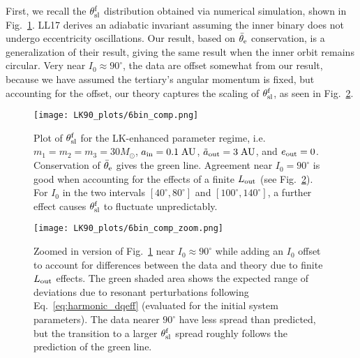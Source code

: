 \documentclass[
        twocolumn,
        twocolappendix
    ]{aastex63}
\begin{document}
First, we recall the $\theta_{\rm sl}^{\rm f}$ distribution obtained via
numerical simulation, shown in Fig.~\ref{fig:bin_comp}. LL17 derives an
adiabatic invariant assuming the inner binary does not undergo eccentricity
oscillations. Our result, based on $\bar{\theta}_{\rm e}$ conservation, is a
generalization of their result, giving the same result when the inner orbit
remains circular. Very near $I_0 \approx 90^\circ$, the data are offset somewhat
from our result, because we have assumed the tertiary's angular momentum is
fixed, but accounting for the offset, our theory captures the scaling of
$\theta_{\rm sl}^{\rm f}$, as seen in Fig.~\ref{fig:bin_comp_zoom}.

\begin{figure}
    \centering
    \texttt{[image: LK90\_plots/6bin\_comp.png]}
    \caption{Plot of $\theta_{\rm sl}^{\rm f}$ for the LK-enhanced parameter
    regime, i.e.\ $m_1 = m_2 = m_3 = 30M_{\odot}$,
    $a_{\rm in} = 0.1\;\mathrm{AU}$, $\tilde{a}_{\rm out} = 3\;\mathrm{AU}$, and $e_{\rm out}
    = 0$. Conservation of $\bar{\theta}_{\rm e}$ gives the green line. Agreement near
    $I_0 = 90^\circ$ is good when accounting for the effects of a finite
    $L_{\rm out}$ (see Fig.~\ref{fig:bin_comp_zoom}). For $I_0$ in the two
    intervals $[40^\circ, 80^\circ]$ and $[100^\circ, 140^\circ]$, a further
    effect causes $\theta_{\rm sl}^{\rm f}$ to fluctuate
    unpredictably.}\label{fig:bin_comp}
\end{figure}

\begin{figure}
    \centering
    \texttt{[image: LK90\_plots/6bin\_comp\_zoom.png]}
    \caption{Zoomed in version of Fig.~\ref{fig:bin_comp} near $I_0 \approx
    90^\circ$ while adding an $I_0$ offset to account for differences between
    the data and theory due to finite $L_{\rm out}$ effects. The green shaded
    area shows the expected range of deviations due to resonant perturbations
    following Eq.~\eqref{eq:harmonic_dqeff} (evaluated for the initial system
    parameters). The data nearer $90^\circ$ have less spread than predicted, but
    the transition to a larger $\theta_{\rm sl}^{\rm f}$ spread roughly follows
    the prediction of the green line.}\label{fig:bin_comp_zoom}
\end{figure}
\end{document}
